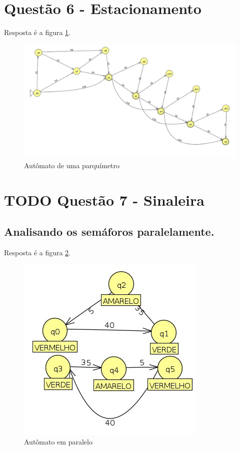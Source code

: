 \documentclass[11pt]{article}
\begin{document}
\section{Questão 6 - Estacionamento}
\label{sec:org06d8374}
Resposta é a figura \ref{fig:org25533fd}.
\begin{figure}[htbp]
\centering
\includegraphics[width=.9\linewidth]{./q6/estacionamento.jpg}
\caption{\label{fig:org25533fd}
Autômato de uma parquímetro}
\end{figure}
\section{{\bfseries\sffamily TODO} Questão 7 - Sinaleira}
\label{sec:org566e593}
\subsection{Analisando os semáforos paralelamente.}
\label{sec:org0b1eec0}

Resposta é a figura \ref{fig:org2ae2d36}.
\begin{figure}[htbp]
\centering
\includegraphics[width=.9\linewidth]{./q7/paralelo.jpg}
\caption{\label{fig:org2ae2d36}
Autômato em paralelo}
\end{figure}
\end{document}
